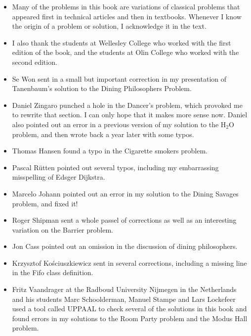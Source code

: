 \documentclass{book}
\begin{document}
\begin{itemize}

\item Many of the problems in this book are variations of classical
problems that appeared first in technical articles and then in textbooks.
Whenever I know the origin of a problem or solution, I acknowledge it
in the text.

\item I also thank the students at Wellesley College who worked with
the first edition of the book, and the students at Olin College who
worked with the second edition.

\item Se Won sent in a small but important correction in my presentation
of Tanenbaum's solution to the Dining Philosophers Problem.

\item Daniel Zingaro punched a hole in the Dancer's problem, which
provoked me to rewrite that section.  I can only hope that it makes more
sense now.  Daniel also pointed out an error in a previous version of
my solution to the H$_2$O problem, and then wrote back a year later
with some typos.

\item Thomas Hansen found a typo in the Cigarette smokers problem.

\item Pascal R\"{u}tten pointed out several typos, including my embarrassing
misspelling of Edsger Dijkstra.

\item Marcelo Johann pointed out an error in my solution to the
Dining Savages problem, and fixed it!

\item Roger Shipman sent a whole passel of corrections as well as
an interesting variation on the Barrier problem.

\item Jon Cass pointed out an omission in the discussion of dining
philosophers.

\item Krzysztof Ko\'{s}ciuszkiewicz sent in several corrections, including
a missing line in the Fifo class definition.

\item Fritz Vaandrager at the Radboud University Nijmegen in the
Netherlands and his students Marc Schoolderman, Manuel Stampe and Lars
Lockefeer used a tool called UPPAAL to check several of the solutions
in this book and found errors in my solutions to the Room Party problem
and the Modus Hall problem.


\end{itemize}
\end{document}
